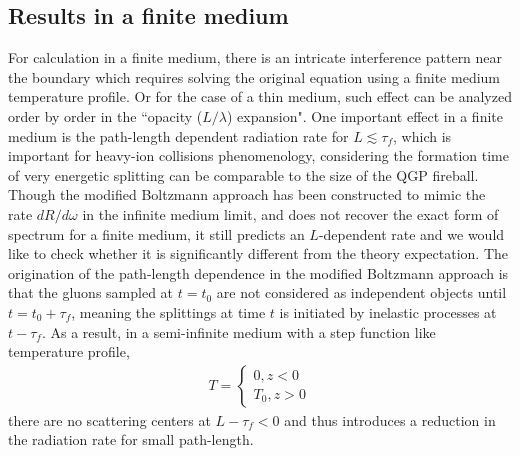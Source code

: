 \documentclass[aps, prc, reprint, amsmath, groupedaddress, nofootinbib]{revtex4-1}
\begin{document}
\subsection{Results in a finite medium}
For calculation in a finite medium, there is an intricate interference pattern near the boundary which requires solving the original equation using a finite medium temperature profile. 
Or for the case of a thin medium, such effect can be analyzed order by order in the ``opacity ($L/\lambda$) expansion". 
One important effect in a finite medium is the path-length dependent radiation rate for $L \lesssim \tau_f$, which is important for heavy-ion collisions phenomenology, considering the formation time of very energetic splitting can be comparable to the size of the QGP fireball.
Though the modified Boltzmann approach has been constructed to mimic the rate $dR/d\omega$ in the infinite medium limit, and does not recover the exact form of spectrum for a finite medium, it still predicts an $L$-dependent rate and we would like to check whether it is significantly different from the theory expectation.
The origination of the path-length dependence in the modified Boltzmann approach is that the gluons sampled at $t=t_0$ are not considered as independent objects until $t = t_0+\tau_f$, meaning the splittings at time $t$ is initiated by inelastic processes at $t-\tau_f$.
As a result, in a semi-infinite medium with a step function like temperature profile, 
\begin{eqnarray}
T = \begin{cases}
0 , z<0\\
T_0, z>0
\end{cases}
\end{eqnarray}
there are no scattering centers at $L-\tau_f<0$ and thus introduces a reduction in the radiation rate for small path-length.
\end{document}
